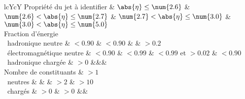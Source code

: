 \begin{tabularx}{\textwidth}{lcYcY}
\toprule
Propriété du jet à identifier & $\abs{\eta}\leq\num{2.6}$ & $\num{2.6}<\abs{\eta}\leq\num{2.7}$ & $\num{2.7}<\abs{\eta}\leq\num{3.0}$ & $\num{3.0}<\abs{\eta}\leq\num{5.0}$ \\
\midrule
Fraction d'énergie\\
\ hadronique neutre & $<\num{0.90}$ & $<\num{0.90}$ &  & $>\num{0.2}$ \\
\ électromagnétique neutre & $<\num{0.90}$ & $<\num{0.99}$ & $<\num{0.99}$ et $>\num{0.02}$ & $<\num{0.90}$ \\
\ hadronique chargée & $>\num{0}$ &&&\\
\midrule
Nombre de constituants & $>\num{1}$\\
\ neutres & & & $>\num{2}$ & $>\num{10}$ \\
\ chargés & $>\num{0}$ & $>\num{0}$ &&\\
\bottomrule
\end{tabularx}
